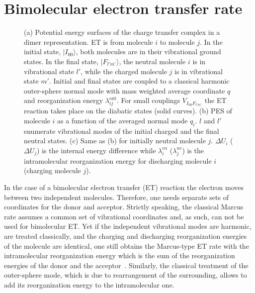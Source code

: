 \newcommand{\indM}{l} 
\newcommand{\indN}{m}
\newcommand{\lb}[1]{\langle #1 |}
\newcommand{\rb}[1]{| #1 \rangle}
\newcommand{\rbt}[1]{ #1 \rangle}

\chapter{Bimolecular electron transfer rate}

\begin{figure*}[ht]
   \caption{
(a) Potential energy surfaces of the charge transfer complex in a dimer representation. ET is from molecule $i$ to molecule $j$. In the initial state, $\rb{I_{00}}$, both molecules are in their vibrational ground states. In the final state, $\rb{F_{l'm'}}$, the neutral molecule $i$ is in vibrational state $l'$, while the charged molecule $j$ is in vibrational state $m'$. Initial and final states are coupled to a classical harmonic outer-sphere normal mode with mass weighted average coordinate $q$ and reorganization energy $\lambda_{ij}^\text{out}$. For small couplings $V_{I_{00}F_{l'm'}}$ the ET reaction takes place on the diabatic states (solid curves). 
%
(b) PES of molecule $i$ as a function of the averaged normal mode $q_i$. $l$ and $l'$ enumerate vibrational modes of the initial charged and the final neutral states. (c) Same as (b) for initially neutral molecule $j$. 
%
$\Delta U_i$ ($\Delta U_j$) is the internal energy difference while $\lambda_i^{cn}$ ($\lambda_j^{nc}$) is the  intramolecular reorganization energy for discharging molecule $i$ (charging molecule $j$). }
   \label{fig:marcus_parabolas}
\end{figure*}

In the case of a bimolecular electron transfer (ET) reaction the electron moves between two independent molecules. Therefore, one needs separate sets of coordinates for the donor and acceptor. Strictly speaking, the classical Marcus rate assumes a common set of vibrational coordinates and, as such, can not be used for bimolecular ET. Yet if the independent vibrational modes are harmonic, are treated classically, and the charging and discharging reorganization energies of the molecule are identical, one still obtains the Marcus-type ET rate with the intramolecular reorganization energy which is the sum of the reorganization energies of the donor and the acceptor~\cite{may_charge_2003}. Similarly, the classical treatment of the outer-sphere mode, which is due to rearrangement of the surrounding, allows to add its reorganization energy  to the intramolecular one.

